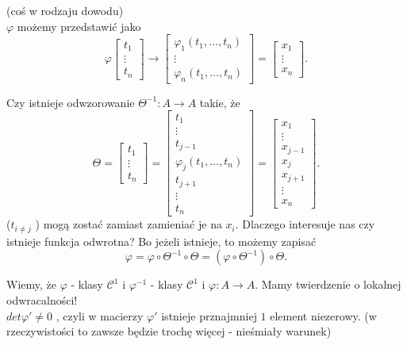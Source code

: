 \documentclass[../main.tex]{subfiles}
\begin{document}
    \begin{dowod}
        (coś w rodzaju dowodu)\\
        $\varphi$ możemy przedstawić jako
        \[
            \varphi \begin{bmatrix} t_1\\ \vdots \\ t_n \end{bmatrix} \to \begin{bmatrix} \varphi_1(t_1,\ldots,t_n)\\ \vdots \\ \varphi_n(t_1,\ldots,t_n) \end{bmatrix} = \begin{bmatrix} x_1 \\ \vdots \\ x_n \end{bmatrix}
        .\]
        \begin{pytanie}
            Czy istnieje odwzorowanie $\Theta^{-1}: A\to A$ takie, że
            \[
                \Theta = \begin{bmatrix} t_1\\ \vdots \\ t_n \end{bmatrix} = \begin{bmatrix} t_1 \\ \vdots \\ t_{j-1} \\ \varphi_j(t_1,\ldots,t_n)\\ t_{j+1} \\ \vdots \\ t_n \end{bmatrix} = \begin{bmatrix} x_1 \\ \vdots \\ x_{j-1} \\ x_j \\ x_{j+1} \\ \vdots \\ x_n \end{bmatrix}
            .\]
            ($t_{i\neq j}$ ) mogą zostać zamiast zamieniać je na $x_i$.
            Dlaczego interesuje nas czy istnieje funkcja odwrotna? Bo jeżeli istnieje, to możemy zapisać
            \[
                \varphi = \varphi \circ \Theta^{-1} \circ \Theta = \left(\varphi \circ \Theta^{-1}\right) \circ \Theta
            .\]
        \end{pytanie}
        Wiemy, że $\varphi$ - klasy $\mathcal{C}^1$ i $\varphi^{-1}$ - klasy $\mathcal{C}^1$ i $\varphi: A\to A$. Mamy twierdzenie o lokalnej odwracalności!\\
        $det \varphi' \neq 0$ , czyli w macierzy $\varphi'$ istnieje prznajmniej $1$ element niezerowy. (w rzeczywistości to zawsze będzie trochę więcej - nieśmiały warunek)


\end{dowod}
\end{document}
